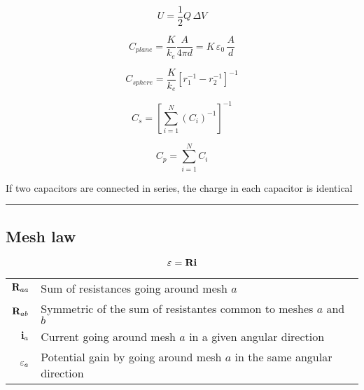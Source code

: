 \documentclass{form}
\begin{document}
\begin{minipage}[c]{0.10\textwidth}
	\begin{equation*}
		U=\frac{1}{2}Q\,\Delta V
	\end{equation*}
\end{minipage}
\begin{minipage}[c]{0.25\textwidth}
	\begin{equation*}
		C_{plane} = \frac{K}{k_e}\frac{A}{4\pi d} = K\,\varepsilon_0 \,\frac{A}{d}
	\end{equation*}
\end{minipage}
\begin{minipage}[c]{0.25\textwidth}
	\begin{equation*}
		C_{sphere} = \frac{K}{k_e}\left[r_1^{-1}-r_2^{-1}\right]^{-1}
	\end{equation*}
\end{minipage}
\begin{center}
	\begin{minipage}[c]{0.17\textwidth}
		\begin{equation*}
			C_s = \left[\sum_{i=1}^{N}{(C_i)^{-1}}\right]^{-1}
		\end{equation*}
	\end{minipage}
	\begin{minipage}[c]{0.11\textwidth}
		\begin{equation*}
			C_p = \sum_{i=1}^{N}{C_i}
		\end{equation*}
	\end{minipage}
	\begin{minipage}[c]{0.70\textwidth}
		If two capacitors are connected in series, the charge in each capacitor is identical
	\end{minipage}
\end{center}
\noindent\rule{\textwidth}{0.4pt}
\begin{minipage}[c]{0.15\textwidth}
	\subsection*{Mesh law}
\end{minipage}
\begin{minipage}[c]{0.15\textwidth}
	\begin{equation*}
		\mathbf{\varepsilon}=\mathbf{R}\mathbf{i}
	\end{equation*}
\end{minipage}
\begin{minipage}[c]{0.65\textwidth}
	\begin{tabular}{ r l }
		$\mathbf{R}_{aa}$ & Sum of resistances going around mesh $a$ \\
		$\mathbf{R}_{ab}$ & Symmetric of the sum of resistantes common to meshes $a$ and $b$\\
		$\mathbf{i}_a   $ & Current going around mesh $a$ in a given angular direction\\
		$\mathbf{\varepsilon}_a$ & Potential gain by going around mesh $a$ in the same angular direction
	\end{tabular}
\end{minipage}\\
\end{document}
